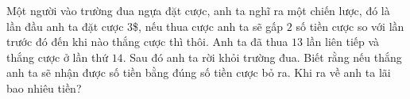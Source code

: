\begin{ex}%
	Một người vào trường đua ngựa đặt cược, anh ta nghĩ ra một chiến lược, đó là lần đầu anh ta đặt cược $3$\$, nếu thua cược anh ta sẽ gấp $2$ số tiền cược so với lần trước đó đến khi nào thắng cược thì thôi. Anh ta đã thua $13$ lần liên tiếp và thắng cược ở lần thứ $14$. Sau đó anh ta rời khỏi trường đua. Biết rằng nếu thắng anh ta sẽ nhận được số tiền bằng đúng số tiền cược bỏ ra. Khi ra về anh ta lãi bao nhiêu tiền?
\end{ex}

